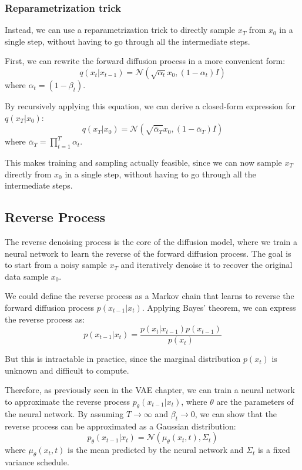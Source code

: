 \subsubsection{Reparametrization trick}
Instead, we can use a reparametrization trick to directly sample $x_T$ from $x_0$ in a single step, without having to go through all the intermediate steps.

First, we can rewrite the forward diffusion process in a more convenient form:
\[
    q(x_t | x_{t-1}) = \mathcal{N}(\sqrt{\alpha_t} x_0, (1 - \alpha_t) I)
\]
where $\alpha_t = (1 - \beta_t)$.

By recursively applying this equation, we can derive a closed-form expression for $q(x_T | x_0)$:
\[
    q(x_T | x_0) = \mathcal{N}(\sqrt{\bar{\alpha}_T} x_0, (1 - \bar{\alpha}_T) I)
\]
where $\bar{\alpha}_T = \prod_{t=1}^{T} \alpha_t$.

This makes training and sampling actually feasible, since we can now sample $x_T$ directly from $x_0$ in a single step, without having to go through all the intermediate steps.

\subsection{Reverse Process}
The reverse denoising process is the core of the diffusion model, where we train a neural network to learn the reverse of the forward diffusion process. 
The goal is to start from a noisy sample $x_T$ and iteratively denoise it to recover the original data sample $x_0$.

We could define the reverse process as a Markov chain that learns to reverse the forward diffusion process $p(x_{t-1} | x_t)$.
Applying Bayes' theorem, we can express the reverse process as:
\[
    p(x_{t-1} | x_t) = \frac{p(x_t | x_{t-1}) p(x_{t-1})}{p(x_t)}
\]

But this is intractable in practice, since the marginal distribution $p(x_t)$ is unknown and difficult to compute.

Therefore, as previously seen in the VAE chapter, we can train a neural network to approximate the reverse process $p_\theta(x_{t-1} | x_t)$, where $\theta$ are the parameters of the neural network.
By assuming $T \rightarrow \infty$ and $\beta_t \rightarrow 0$, we can show that the reverse process can be approximated as a Gaussian distribution:
\[
    p_\theta(x_{t-1} | x_t) = \mathcal{N}(\mu_\theta(x_t, t), \Sigma_t)
\]
where $\mu_\theta(x_t, t)$ is the mean predicted by the neural network and $\Sigma_t$ is a fixed variance schedule.


